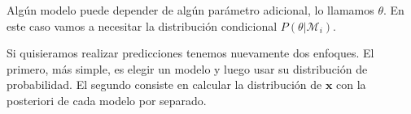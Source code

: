 Alg\'un modelo puede depender de alg\'un par\'ametro adicional, lo llamamos $\theta$. En este caso vamos a necesitar la distribuci\'on condicional $P(\theta|\mathcal{M}_i)$.

Si quisieramos realizar predicciones tenemos nuevamente dos enfoques. El primero, m\'as simple, es elegir un modelo y luego usar su distribuci\'on de probabilidad. El segundo consiste en calcular la distribuci\'on de $\mathbf{x}$ con la posteriori de cada modelo por separado.